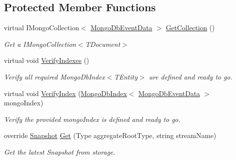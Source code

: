 \subsection*{Protected Member Functions}
\begin{DoxyCompactItemize}
\item 
virtual I\+Mongo\+Collection$<$ \hyperlink{classCqrs_1_1MongoDB_1_1Events_1_1MongoDbEventData}{Mongo\+Db\+Event\+Data} $>$ \hyperlink{classCqrs_1_1MongoDB_1_1Events_1_1MongoDbSnapshotStore_a995fcf56b131f6ac7f389a27992cf2ce_a995fcf56b131f6ac7f389a27992cf2ce}{Get\+Collection} ()
\begin{DoxyCompactList}\small\item\em Get a I\+Mongo\+Collection$<$\+T\+Document$>$ \end{DoxyCompactList}\item 
virtual void \hyperlink{classCqrs_1_1MongoDB_1_1Events_1_1MongoDbSnapshotStore_acd33edfb8ad3d8923be5fd265d91b2a4_acd33edfb8ad3d8923be5fd265d91b2a4}{Verify\+Indexes} ()
\begin{DoxyCompactList}\small\item\em Verify all required Mongo\+Db\+Index$<$\+T\+Entity$>$ are defined and ready to go. \end{DoxyCompactList}\item 
virtual void \hyperlink{classCqrs_1_1MongoDB_1_1Events_1_1MongoDbSnapshotStore_ab22a32df32528c82412028884bbbe9ae_ab22a32df32528c82412028884bbbe9ae}{Verify\+Index} (\hyperlink{classCqrs_1_1MongoDB_1_1DataStores_1_1Indexes_1_1MongoDbIndex}{Mongo\+Db\+Index}$<$ \hyperlink{classCqrs_1_1MongoDB_1_1Events_1_1MongoDbEventData}{Mongo\+Db\+Event\+Data} $>$ mongo\+Index)
\begin{DoxyCompactList}\small\item\em Verify the provided {\itshape mongo\+Index}  is defined and ready to go. \end{DoxyCompactList}\item 
override \hyperlink{classCqrs_1_1Snapshots_1_1Snapshot}{Snapshot} \hyperlink{classCqrs_1_1MongoDB_1_1Events_1_1MongoDbSnapshotStore_acb01680aad8c2671206bc851da17a036_acb01680aad8c2671206bc851da17a036}{Get} (Type aggregate\+Root\+Type, string stream\+Name)
\begin{DoxyCompactList}\small\item\em Get the latest Snapshot from storage. \end{DoxyCompactList}\end{DoxyCompactItemize}
